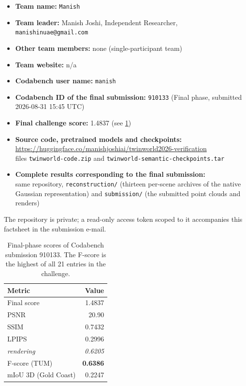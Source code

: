 \documentclass[10pt,twocolumn,letterpaper]{article}
\begin{document}
\begin{itemize}\itemsep2pt
\item \textbf{Team name:} \texttt{Manish}
\item \textbf{Team leader:} Manish Joshi, Independent Researcher,
      \texttt{manishinuae@gmail.com}
\item \textbf{Other team members:} none (single-participant team)
\item \textbf{Team website:} n/a
\item \textbf{Codabench user name:} \texttt{manish}
\item \textbf{Codabench ID of the final submission:} \texttt{910133}
      (Final phase, submitted 2026-08-31 15:45 UTC)
\item \textbf{Final challenge score:} 1.4837 (see \cref{tab:scores})
\item \textbf{Source code, pretrained models and checkpoints:}\\
      \url{https://huggingface.co/manishjoshiai/twinworld2026-verification}\\
      files \texttt{twinworld-code.zip} and
      \texttt{twinworld-semantic-checkpoints.tar}
\item \textbf{Complete results corresponding to the final submission:}\\
      same repository, \texttt{reconstruction/} (thirteen per-scene archives of
      the native Gaussian representation) and \texttt{submission/} (the
      submitted point clouds and renders)
\end{itemize}

The repository is private; a read-only access token scoped to it accompanies
this factsheet in the submission e-mail.

\begin{table}[t]
\centering
\begin{tabular}{@{}lr@{}}
\toprule
Metric & Value \\
\midrule
Final score      & 1.4837 \\
\midrule
PSNR             & 20.90 \\
SSIM             & 0.7432 \\
LPIPS            & 0.2996 \\
\emph{rendering} & \emph{0.6205} \\
\midrule
F-score (TUM)    & \textbf{0.6386} \\
mIoU 3D (Gold Coast) & 0.2247 \\
\bottomrule
\end{tabular}
\caption{Final-phase scores of Codabench submission 910133. The F-score is the
highest of all 21 entries in the challenge.}
\label{tab:scores}
\end{table}
\end{document}
